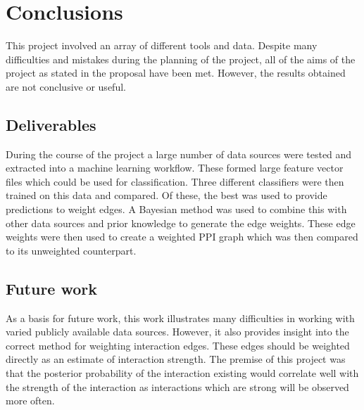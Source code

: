 \chapter{Conclusions}
\label{conclusion}

This project involved an array of different tools and data.
Despite many difficulties and mistakes during the planning of the project, all of the aims of the project as stated in the proposal have been met.
However, the results obtained are not conclusive or useful.


\section{Deliverables}
During the course of the project a large number of data sources were tested and extracted into a machine learning workflow.
These formed large feature vector files which could be used for classification.
Three different classifiers were then trained on this data and compared.
Of these, the best was used to provide predictions to weight edges.
A Bayesian method was used to combine this with other data sources and prior knowledge to generate the edge weights.
These edge weights were then used to create a weighted PPI graph which was then compared to its unweighted counterpart.




\section{Future work}
As a basis for future work, this work illustrates many difficulties in working with varied publicly available data sources.
However, it also provides insight into the correct method for weighting interaction edges.
These edges should be weighted directly as an estimate of interaction strength.
The premise of this project was that the posterior probability of the interaction existing would correlate well with the strength of the interaction as interactions which are strong will be observed more often.

